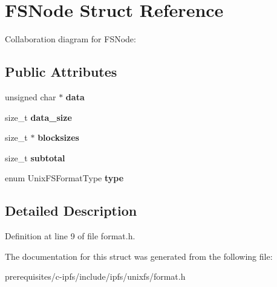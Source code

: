 \hypertarget{struct_f_s_node}{}\section{F\+S\+Node Struct Reference}
\label{struct_f_s_node}


Collaboration diagram for F\+S\+Node\+:
\subsection*{Public Attributes}
\begin{DoxyCompactItemize}
\item 
\mbox{\label{struct_f_s_node_a0c56f52f80e1cff0148bbd78127e2dff}} 
unsigned char $\ast$ {\bfseries data}
\item 
\mbox{\label{struct_f_s_node_a353795ec7bd2571147f7af508fc7b5ae}} 
size\+\_\+t {\bfseries data\+\_\+size}
\item 
\mbox{\label{struct_f_s_node_ae3f4b290ac8fd143b3301028cf09a6c3}} 
size\+\_\+t $\ast$ {\bfseries blocksizes}
\item 
\mbox{\label{struct_f_s_node_a4e36699e218137b880b34e6aad16bd1a}} 
size\+\_\+t {\bfseries subtotal}
\item 
\mbox{\label{struct_f_s_node_a1a769f90f96ea19cabdf547b51f30819}} 
enum Unix\+F\+S\+Format\+Type {\bfseries type}
\end{DoxyCompactItemize}


\subsection{Detailed Description}


Definition at line 9 of file format.\+h.



The documentation for this struct was generated from the following file\+:\begin{DoxyCompactItemize}
\item 
prerequisites/c-\/ipfs/include/ipfs/unixfs/format.\+h\end{DoxyCompactItemize}

